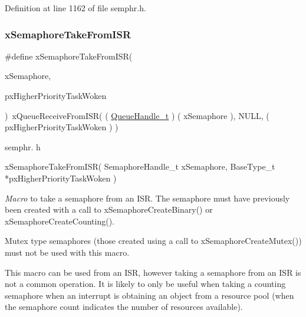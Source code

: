 Definition at line 1162 of file semphr.\+h.

\mbox{\label{group___semaphores_ga076419b58e072655686939016e7ca3c5}} 
\subsubsection{\texorpdfstring{x\+Semaphore\+Take\+From\+I\+SR}{xSemaphoreTakeFromISR}}
{\footnotesize\ttfamily \#define x\+Semaphore\+Take\+From\+I\+SR(\begin{DoxyParamCaption}\item[{}]{x\+Semaphore,  }\item[{}]{px\+Higher\+Priority\+Task\+Woken }\end{DoxyParamCaption})~x\+Queue\+Receive\+From\+I\+SR( ( \hyperlink{group___queue_management_gaaf19d499892a4ce1409326ece00f5264}{Queue\+Handle\+\_\+t} ) ( x\+Semaphore ), N\+U\+LL, ( px\+Higher\+Priority\+Task\+Woken ) )}

semphr. h 
\begin{DoxyPre}
xSemaphoreTakeFromISR(
                         SemaphoreHandle\_t xSemaphore,
                         BaseType\_t *pxHigherPriorityTaskWoken
                     )\end{DoxyPre}


{\itshape Macro} to take a semaphore from an I\+SR. The semaphore must have previously been created with a call to x\+Semaphore\+Create\+Binary() or x\+Semaphore\+Create\+Counting().

Mutex type semaphores (those created using a call to x\+Semaphore\+Create\+Mutex()) must not be used with this macro.

This macro can be used from an I\+SR, however taking a semaphore from an I\+SR is not a common operation. It is likely to only be useful when taking a counting semaphore when an interrupt is obtaining an object from a resource pool (when the semaphore count indicates the number of resources available).


